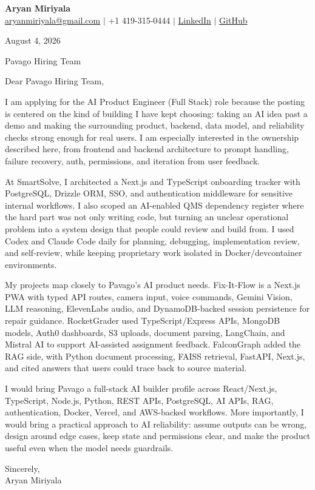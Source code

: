 \documentclass[letterpaper,11pt]{article}
\begin{document}
{\Large\textbf{Aryan Miriyala}}\\
\href{mailto:aryanmiriyala@gmail.com}{aryanmiriyala@gmail.com} $|$ +1 419-315-0444 $|$
\href{https://www.linkedin.com/in/aryan-miriyala-7788a21b6/}{LinkedIn} $|$
\href{https://github.com/aryanmiriyala}{GitHub}

August 4, 2026

Pavago Hiring Team

Dear Pavago Hiring Team,

I am applying for the AI Product Engineer (Full Stack) role because the posting is centered on the kind of building I have kept choosing: taking an AI idea past a demo and making the surrounding product, backend, data model, and reliability checks strong enough for real users. I am especially interested in the ownership described here, from frontend and backend architecture to prompt handling, failure recovery, auth, permissions, and iteration from user feedback.

At SmartSolve, I architected a Next.js and TypeScript onboarding tracker with PostgreSQL, Drizzle ORM, SSO, and authentication middleware for sensitive internal workflows. I also scoped an AI-enabled QMS dependency register where the hard part was not only writing code, but turning an unclear operational problem into a system design that people could review and build from. I used Codex and Claude Code daily for planning, debugging, implementation review, and self-review, while keeping proprietary work isolated in Docker/devcontainer environments.

My projects map closely to Pavago's AI product needs. Fix-It-Flow is a Next.js PWA with typed API routes, camera input, voice commands, Gemini Vision, LLM reasoning, ElevenLabs audio, and DynamoDB-backed session persistence for repair guidance. RocketGrader used TypeScript/Express APIs, MongoDB models, Auth0 dashboards, S3 uploads, document parsing, LangChain, and Mistral AI to support AI-assisted assignment feedback. FalconGraph added the RAG side, with Python document processing, FAISS retrieval, FastAPI, Next.js, and cited answers that users could trace back to source material.

I would bring Pavago a full-stack AI builder profile across React/Next.js, TypeScript, Node.js, Python, REST APIs, PostgreSQL, AI APIs, RAG, authentication, Docker, Vercel, and AWS-backed workflows. More importantly, I would bring a practical approach to AI reliability: assume outputs can be wrong, design around edge cases, keep state and permissions clear, and make the product useful even when the model needs guardrails.

Sincerely,\\
Aryan Miriyala
\end{document}
